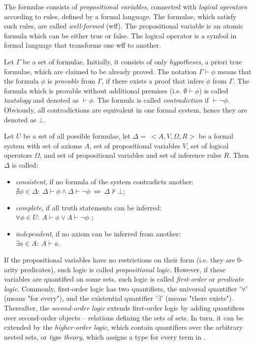 \documentclass[article]{aaltoseries}
\begin{document}
The formulae consists of \textit{propositional variables}, connected with \textit{logical operators} according to rules, defined by a formal language. The formulae, which satisfy such rules, are called \textit{well-formed} (wff). The propositional variable is an atomic formula which can be either true or false. The logical operator is a symbol in formal language that transforms one wff to another.

Let $\Gamma$ be a set of formulae. Initially, it consists of only \textit{hypotheses}, a priori true formulae, which are claimed to be already proved. The notation $\Gamma \vdash \phi$ means that the formula $\phi$ is \textit{provable} from $\Gamma$, if there exists a proof that infers $\phi$ from $\Gamma$. The formula which is provable without additional premises (i.e. $\emptyset \vdash \phi$) is called \textit{tautology} and denoted as $ \vdash \phi $. The formula is called \textit{contradiction} if $\vdash \neg \phi$. Obviously, all contradictions are equivalent in one formal system, hence they are denoted as $\bot$.


Let $U$ be a set of all possible formulae, let $\Delta = \ <A, V, \Omega, R>$ be a formal system with set of axioms $A$, set of propositional variables $V$, set of logical operators $\Omega$, and set of propositional variables and set of inference rules $R$. Then $\Delta$ is called:
\begin{itemize}
	\itemsep0em
	\item \textit{consistent}, if no formula of the system contradicts another: \\
		$\nexists \phi \in \Delta: \ \Delta \vdash \phi \land \Delta \vdash \neg \phi  \ \Leftrightarrow \ \Delta \nvdash \bot$;
	\item \textit{complete}, if all truth statements can be inferred: \\
		$\forall \phi \in U: \ A \vdash \phi \lor A \vdash \neg \phi$ ;
	\item \textit{independent}, if no axiom can be inferred from another: \\
		$\exists a \in A: \ A \vdash a$.
\end{itemize}


If the propositional variables have no restrictions on their form (i.e. they are 0-arity predicates), such logic is called \textit{propositional logic}. However, if these variables are quantified on some sets, such logic is called \textit{first-order} or \textit{predicate logic}. Commonly, first-order logic has two quantifiers, the universal quantifier '$\forall$' (means "for every"), and the existential quantifier '$\exists$' (means "there exists"). Thereafter, the \textit{second-order logic} extends first-order logic by adding quantifiers over second-order objects -- relations defining the sets of sets. In turn, it can be extended by the \textit{higher-order logic}, which contain quantifiers over the arbitrary nested sets, or \textit{type theory}, which assigns a type for every term in .
\end{document}
